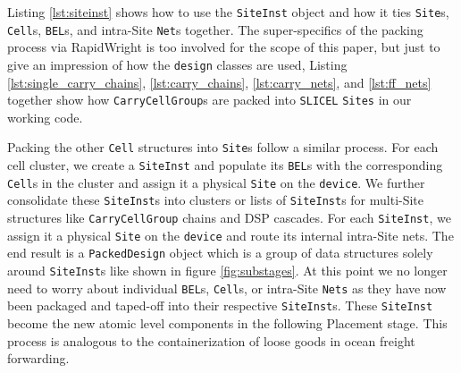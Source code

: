 
Listing \ref{lst:siteinst} shows how to use the \texttt{SiteInst} object and how it ties \texttt{Site}s, \texttt{Cell}s, \texttt{BEL}s, and intra-Site \texttt{Net}s together. 
The super-specifics of the packing process via RapidWright is too involved for the scope of this paper, but just to give an impression of how the \texttt{design} classes are used, Listing \ref{lst:single_carry_chains}, \ref{lst:carry_chains}, \ref{lst:carry_nets}, and \ref{lst:ff_nets} together show how \texttt{CarryCellGroup}s are packed into \texttt{SLICEL} \texttt{Sites} in our working code. 

Packing the other \texttt{Cell} structures into \texttt{Site}s follow a similar process. 
For each cell cluster, we create a \texttt{SiteInst} and populate its \texttt{BEL}s with the corresponding \texttt{Cell}s in the cluster and assign it a physical \texttt{Site} on the \texttt{device}.
We further consolidate these \texttt{SiteInst}s into clusters or lists of \texttt{SiteInst}s for multi-Site structures like \texttt{CarryCellGroup} chains and DSP cascades. 
For each \texttt{SiteInst}, we assign it a physical \texttt{Site} on the \texttt{device} and route its internal intra-Site nets. 
The end result is a \texttt{PackedDesign} object which is a group of data structures solely around \texttt{SiteInst}s like shown in figure \ref{fig:substages}.
At this point we no longer need to worry about individual \texttt{BEL}s, \texttt{Cell}s, or intra-Site \texttt{Nets} as they have now been packaged and taped-off into their respective \texttt{SiteInst}s. 
These \texttt{SiteInst} become the new atomic level components in the following Placement stage. 
This process is analogous to the containerization of loose goods in ocean freight forwarding. 

